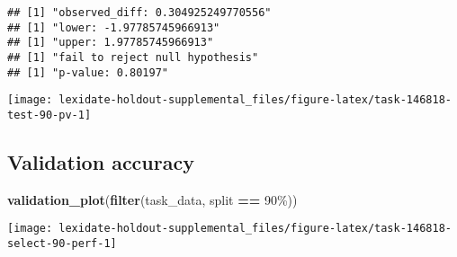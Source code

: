 \documentclass[
]{book}
\newenvironment{Shaded}{\begin{snugshade}}{\end{snugshade}}
\newcommand{\AttributeTok}[1]{\textcolor[rgb]{0.13,0.29,0.53}{#1}}
\newcommand{\DecValTok}[1]{\textcolor[rgb]{0.00,0.00,0.81}{#1}}
\newcommand{\FunctionTok}[1]{\textcolor[rgb]{0.13,0.29,0.53}{\textbf{#1}}}
\newcommand{\NormalTok}[1]{#1}
\newcommand{\OtherTok}[1]{\textcolor[rgb]{0.56,0.35,0.01}{#1}}
\newcommand{\SpecialCharTok}[1]{\textcolor[rgb]{0.81,0.36,0.00}{\textbf{#1}}}
\newcommand{\StringTok}[1]{\textcolor[rgb]{0.31,0.60,0.02}{#1}}
\begin{document}
\begin{Shaded}
\end{Shaded}

\begin{verbatim}
## [1] "observed_diff: 0.304925249770556"
## [1] "lower: -1.97785745966913"
## [1] "upper: 1.97785745966913"
## [1] "fail to reject null hypothesis"
## [1] "p-value: 0.80197"
\end{verbatim}

\texttt{[image: lexidate-holdout-supplemental\_files/figure-latex/task-146818-test-90-pv-1]}

\hypertarget{validation-accuracy-3}{%
\subsection{Validation accuracy}\label{validation-accuracy-3}}

\begin{Shaded}
\begin{Highlighting}[]
\FunctionTok{validation\_plot}\NormalTok{(}\FunctionTok{filter}\NormalTok{(task\_data, split }\SpecialCharTok{==} \StringTok{\textquotesingle{}90\%\textquotesingle{}}\NormalTok{))}
\end{Highlighting}
\end{Shaded}

\texttt{[image: lexidate-holdout-supplemental\_files/figure-latex/task-146818-select-90-perf-1]}
\end{document}

